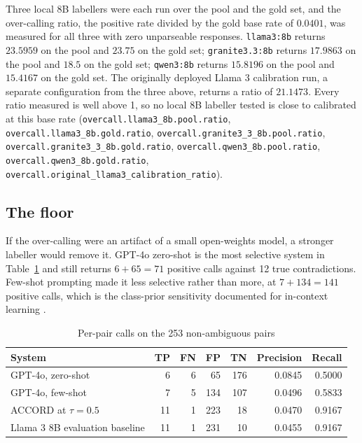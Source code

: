 Three local 8B labellers were each run over the pool and the gold set, and the
over-calling ratio, the positive rate divided by the gold base rate of
$0.0401$, was measured for all three with zero unparseable responses.
\texttt{llama3:8b} returns $23.5959$ on the pool and $23.75$ on the gold set;
\texttt{granite3.3:8b} returns $17.9863$ on the pool and $18.5$ on the gold
set; \texttt{qwen3:8b} returns $15.8196$ on the pool and $15.4167$ on the gold
set. The originally deployed Llama 3 calibration run, a separate configuration
from the three above, returns a ratio of $21.1473$. Every ratio measured is
well above 1, so no local 8B labeller tested is close to calibrated at this
base rate
(\texttt{overcall.llama3\_8b.pool.ratio}, \texttt{overcall.llama3\_8b.gold.ratio},
\texttt{overcall.granite3\_3\_8b.pool.ratio},
\texttt{overcall.granite3\_3\_8b.gold.ratio}, \texttt{overcall.qwen3\_8b.pool.ratio},
\texttt{overcall.qwen3\_8b.gold.ratio},
\texttt{overcall.original\_llama3\_calibration\_ratio}).

\subsection{The floor}

If the over-calling were an artifact of a small open-weights model, a stronger
labeller would remove it. GPT-4o zero-shot \citep{openai2023gpt4} is the most
selective system in Table~\ref{tab:systems253} and still returns $6 + 65 = 71$
positive calls against 12 true contradictions. Few-shot prompting made it less
selective rather than more, at $7 + 134 = 141$ positive calls, which is the
class-prior sensitivity documented for in-context learning
\citep{zhao2021calibrate}.

\begin{table}[H]
\caption{Per-pair calls on the 253 non-ambiguous pairs}
\centering
\small
\begin{tabular}{lrrrrrr}
\toprule
\textbf{System} & \textbf{TP} & \textbf{FN} & \textbf{FP} & \textbf{TN} &
\textbf{Precision} & \textbf{Recall} \\
\midrule
GPT-4o, zero-shot              & 6  & 6 & 65  & 176 & 0.0845 & 0.5000 \\
GPT-4o, few-shot               & 7  & 5 & 134 & 107 & 0.0496 & 0.5833 \\
ACCORD at $\tau = 0.5$         & 11 & 1 & 223 & 18  & 0.0470 & 0.9167 \\
Llama 3 8B evaluation baseline & 11 & 1 & 231 & 10  & 0.0455 & 0.9167 \\
\bottomrule
\end{tabular}
\label{tab:systems253}
\end{table}

